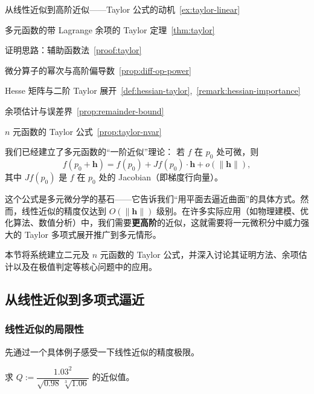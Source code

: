 \documentclass[lang=cn,11pt]{elegantbook}
\begin{document}
\begin{introduction}
  \item 从线性近似到高阶近似——Taylor 公式的动机~\ref{ex:taylor-linear}
  \item 多元函数的带 Lagrange 余项的 Taylor 定理~\ref{thm:taylor}
  \item 证明思路：辅助函数法~\ref{proof:taylor}
  \item 微分算子的幂次与高阶偏导数~\ref{prop:diff-op-power}
  \item Hesse 矩阵与二阶 Taylor 展开~\ref{def:hessian-taylor},~\ref{remark:hessian-importance}
  \item 余项估计与误差界~\ref{prop:remainder-bound}
  \item $n$ 元函数的 Taylor 公式~\ref{prop:taylor-nvar}
\end{introduction}

我们已经建立了多元函数的“一阶近似”理论：
若 $f$ 在 $p_0$ 处可微，则
\[
f(p_0+\boldsymbol h)=f(p_0)+Jf(p_0)\cdot\boldsymbol h+o(\|\boldsymbol h\|),
\]
其中 $Jf(p_0)$ 是 $f$ 在 $p_0$ 处的 Jacobian（即梯度行向量）。

这个公式是多元微分学的基石——它告诉我们“用平面去逼近曲面”的具体方式。然而，线性近似的精度仅达到 $O(\|\boldsymbol h\|)$ 级别。在许多实际应用（如物理建模、优化算法、数值分析）中，我们需要\textbf{更高阶}的近似，这就需要将一元微积分中威力强大的 Taylor 多项式展开推广到多元情形。

本节将系统建立二元及 $n$ 元函数的 Taylor 公式，并深入讨论其证明方法、余项估计以及在极值判定等核心问题中的应用。


\subsection{从线性近似到多项式逼近}

\subsubsection*{线性近似的局限性}

先通过一个具体例子感受一下线性近似的精度极限。

\begin{exercise}[线性近似计算] \label{ex:taylor-linear}
求 $Q:=\dfrac{1.03^2}{\sqrt{0.98}\,\sqrt[3]{1.06}}$ 的近似值。
\end{exercise}
\end{document}
